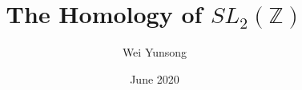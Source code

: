 \documentclass{article}
\theoremstyle{definition}
\theoremstyle{remark}
\numberwithin{equation}{section}
\begin{document}
\title{The Homology of $SL_2(\mathbb{Z})$}
\author{Wei Yunsong}
\date{June 2020}


\setlength{\parindent}{2em}
\maketitle
\tableofcontents
\newpage





%




\end{document}
